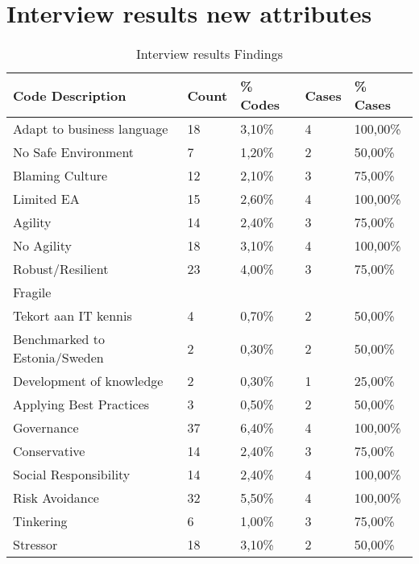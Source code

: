 \section{Interview results new attributes}
\label{sec:interviewresultsnewattributes}
\begin{table}[H]
	\centering
	\begin{tabular}{lllll}
		\toprule
		\textbf{Code} \textbf{Description} & \textbf{Count} & \textbf{\% Codes} & \textbf{Cases} & \textbf{\% Cases} \\
		\midrule
		Adapt to business language & 18    & 3,10\% & 4     & 100,00\% \\
		No Safe Environment & 7     & 1,20\% & 2     & 50,00\% \\
		Blaming Culture & 12    & 2,10\% & 3     & 75,00\% \\
		Limited EA & 15    & 2,60\% & 4     & 100,00\% \\
		Agility & 14    & 2,40\% & 3     & 75,00\% \\
		No Agility & 18    & 3,10\% & 4     & 100,00\% \\
		Robust/Resilient & 23    & 4,00\% & 3     & 75,00\% \\
		Fragile &       &       &       &  \\
		Tekort aan IT kennis & 4     & 0,70\% & 2     & 50,00\% \\
		Benchmarked to Estonia/Sweden & 2     & 0,30\% & 2     & 50,00\% \\
		Development of knowledge & 2     & 0,30\% & 1     & 25,00\% \\
		Applying Best Practices & 3     & 0,50\% & 2     & 50,00\% \\
		Governance & 37    & 6,40\% & 4     & 100,00\% \\
		Conservative & 14    & 2,40\% & 3     & 75,00\% \\
		Social Responsibility & 14    & 2,40\% & 4     & 100,00\% \\
		Risk Avoidance & 32    & 5,50\% & 4     & 100,00\% \\
		Tinkering & 6     & 1,00\% & 3     & 75,00\% \\
		Stressor & 18    & 3,10\% & 2     & 50,00\% \\
		\bottomrule
	\end{tabular}%
	\caption{Interview results Findings}%
	\label{tab:interviewresultsfindings}%
\end{table}%
